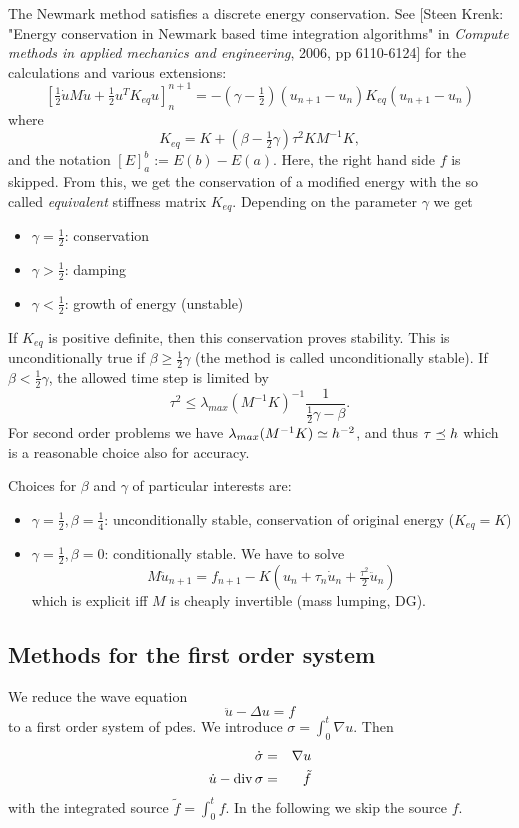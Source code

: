 The Newmark method satisfies a discrete energy conservation. See [Steen Krenk: "Energy conservation in Newmark based time integration algorithms" in {\it Compute methods in applied mechanics and engineering}, 2006, pp 6110-6124] for the
calculations and various extensions:
$$
\left[ \tfrac{1}{2} \dot u M \dot u + \tfrac{1}{2} u^T K_{eq} u \right]_n^{n+1} = -(\gamma - \tfrac{1}{2})  (u_{n+1} - u_n) K_{eq} (u_{n+1} - u_n)
$$
where 
$$
K_{eq} = K + (\beta - \tfrac{1}{2} \gamma) \tau^2 K M^{-1} K,
$$
and the notation $[E ]_a^b := E(b) - E(a)$. Here, the right hand side $f$ is skipped. From this, we get the conservation of a modified energy with the so called {\it equivalent} stiffness matrix $K_{eq}$. Depending on the parameter $\gamma$ we get
\begin{itemize}
\item $\gamma = \tfrac{1}{2}$:  conservation 
\item $\gamma > \tfrac{1}{2}$:  damping
\item $\gamma < \tfrac{1}{2}$:  growth of energy (unstable)
\end{itemize}
If $K_{eq}$ is positive definite, then this conservation proves stability. This is unconditionally true if $\beta \geq \tfrac{1}{2} \gamma$ (the method is called unconditionally stable). If $\beta < \tfrac{1}{2} \gamma$, the allowed time step is limited by 
$$
\tau^2 \leq \lambda_{max}(M^{-1}K)^{-1} \frac{1}{\tfrac{1}{2} \gamma - \beta}.
$$
For second order problems we have $\lambda_{max}(M^{-1}K) \simeq h^{-2}$, and thus $\tau \preceq h$ which is a reasonable choice also for accuracy.

Choices for $\beta$ and $\gamma$ of particular interests are:
\begin{itemize}
\item
$\gamma = \tfrac{1}{2}, \beta = \tfrac{1}{4}$: unconditionally stable, conservation of original energy ($K_{eq} = K$)
\item
$\gamma = \tfrac{1}{2}, \beta = 0$: conditionally stable. We have to solve 
$$
M \ddot u_{n+1} = f_{n+1} - K (u_n + \tau_n \dot u_n + \tfrac{\tau^2}{2} \ddot u_n)
$$
which is explicit iff $M$ is cheaply invertible (mass lumping, DG).
\end{itemize}


\subsection{Methods for the first order system}
We reduce the wave equation
$$
\ddot u - \Delta u = f
$$
to a first order system of pdes. We introduce  $\sigma = \int_0^t \nabla u$. Then
\begin{eqnarray*}
\dot \sigma & = & \nabla u \\
\dot u - \operatorname{div} \sigma & = & \tilde f
\end{eqnarray*}
with the integrated source $\tilde f = \int_0^t f$. In the following we skip the source $f$.

